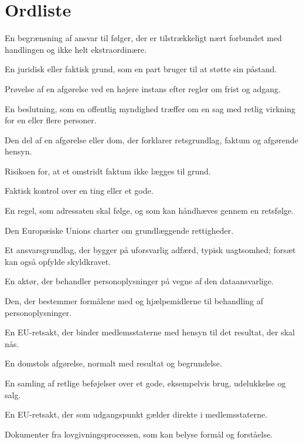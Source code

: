 \chapter{Ordliste}

\begin{description}[style=nextline,leftmargin=0pt,labelindent=0pt]
  \item[Adækvans] En begrænsning af ansvar til følger, der er tilstrækkeligt nært forbundet med handlingen og ikke helt ekstraordinære.
  \item[Anbringende] En juridisk eller faktisk grund, som en part bruger til at støtte sin påstand.
  \item[Appel] Prøvelse af en afgørelse ved en højere instans efter regler om frist og adgang.
  \item[Afgørelse] En beslutning, som en offentlig myndighed træffer om en sag med retlig virkning for en eller flere personer.
  \item[Begrundelse] Den del af en afgørelse eller dom, der forklarer retsgrundlag, faktum og afgørende hensyn.
  \item[Bevisbyrde] Risikoen for, at et omstridt faktum ikke lægges til grund.
  \item[Besiddelse] Faktisk kontrol over en ting eller et gode.
  \item[Bindende regel] En regel, som adressaten skal følge, og som kan håndhæves gennem en retsfølge.
  \item[Charteret] Den Europæiske Unions charter om grundlæggende rettigheder.
  \item[Culpa] Et ansvarsgrundlag, der bygger på uforsvarlig adfærd, typisk uagtsomhed; forsæt kan også opfylde skyldkravet.
  \item[Databehandler] En aktør, der behandler personoplysninger på vegne af den dataansvarlige.
  \item[Dataansvarlig] Den, der bestemmer formålene med og hjælpemidlerne til behandling af personoplysninger.
  \item[Direktiv] En EU-retsakt, der binder medlemsstaterne med hensyn til det resultat, der skal nås.
  \item[Dom] En domstols afgørelse, normalt med resultat og begrundelse.
  \item[Ejendomsret] En samling af retlige beføjelser over et gode, eksempelvis brug, udelukkelse og salg.
  \item[EU-forordning] En EU-retsakt, der som udgangspunkt gælder direkte i medlemsstaterne.
  \item[Forarbejder] Dokumenter fra lovgivningsprocessen, som kan belyse formål og forståelse.

\end{description}
